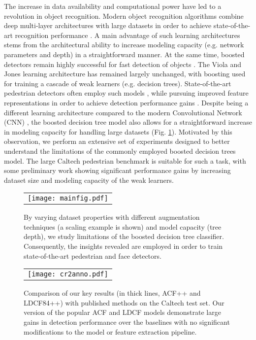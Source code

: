 \documentclass[a4paper,conference]{IEEEtran_icpr}
\begin{document}
The increase in data availability and computational power have led to a revolution in object recognition. Modern object recognition algorithms combine deep multi-layer architectures with large datasets in order to achieve state-of-the-art recognition performance \cite{imagenet,sermanet13,simonyan2014very}. A main advantage of such learning architectures stems from the architectural ability to increase modeling capacity (e.g. network parameters and depth) in a straightforward manner. At the same time, boosted detectors \cite{vj,6977320,dollar2012pedestrian} remain highly successful for fast detection of objects \cite{zhang2015efficient,de2014combinator,tenyerspeds,gpuicf,zhang2014center,jones2008pedestrian,icf,acostea,DollarPAMI14pyramids,ldcf,vehicles_TITS15,spatialpooleecv,ccf,compACT,costea2015fast}.
The Viola and Jones \cite{vj} learning architecture has remained largely unchanged, with boosting \cite{boost} used for training a cascade of weak learners (e.g. decision trees). State-of-the-art pedestrian detectors often employ such models \cite{DollarPAMI14pyramids}, while pursuing improved feature representations in order to achieve detection performance gains \cite{tenyerspeds,ldcf}. Despite being a different learning architecture compared to the modern Convolutional Network (CNN) \cite{imagenet}, the boosted decision tree model also allows for a straightforward increase in modeling capacity for handling large datasets (Fig. \ref{fig:fig1}). Motivated by this observation, we perform an extensive set of experiments designed to better understand the limitations of the commonly employed boosted decision trees model. The large Caltech pedestrian benchmark \cite{dollar2012pedestrian} is suitable for such a task, with some preliminary work \cite{ldcf,checkerboard} showing significant performance gains by increasing dataset size and modeling capacity of the weak learners. 
\begin{figure}[!t]
\centering
\begin{tabular}{c}
\texttt{[image: mainfig.pdf]}
   \end{tabular}
 \caption{By varying dataset properties with different augmentation techniques (a scaling example is shown) and model capacity (tree depth), we study limitations of the boosted decision tree classifier. Consequently, the insights revealed are employed in order to train state-of-the-art pedestrian and face detectors.}
 \label{fig:fig1}
\end{figure}


\begin{figure}[!t]
\centering
\begin{tabular}{c}
\texttt{[image: cr2anno.pdf]}
   \end{tabular}
 \caption{Comparison of our key results (in thick lines, ACF++ and LDCF84++) with published methods on the Caltech test set. Our version of the popular ACF and LDCF models demonstrate large gains in detection performance over the baselines with no significant modifications to the model or feature extraction pipeline.}
 \label{fig:usareason}
\end{figure}
\end{document}
